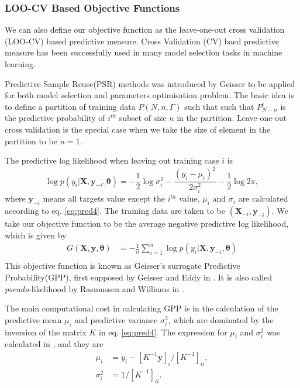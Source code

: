 \documentclass[11pt,a4paper]{article}
\theoremstyle{definition}
\numberwithin{equation}{section}
\let\vec\mathbf
\begin{document}
\subsubsection{LOO-CV Based Objective Functions}
We can also define our objective function as the leave-one-out cross validation (LOO-CV) based predictive measure. Cross Validation (CV) baed predictive measure has been successfully used in many model selection tasks in machine learning\cite[Cawley and Talbot]{Cawley_Talbot}\cite[Sundararajan and Keerthi]{Sundararajan_Keerthi}. 

Predictive Sample Reuse(PSR) methods was introduced by Geisser\cite{Geisser} to be applied for both model selection and parameters optimisation problem. The basic idea is to define a partition of training data $P(N,n,\Gamma)$ such that such that $P_{N-n}^i$ is the predictive probability of $i^{th}$ subset of size $n$ in the partition. Leave-one-out cross validation is the special case when we take the size of element in the partition to be $n=1$.

The predictive log likelihood when leaving out training case $i$ is
\begin{equation}\label{GPP_1}
\log p(y_i|\vec X,\vec y_{-i},\vec \theta) = -\frac{1}{2}\log\sigma^2_i - \frac{(y_i - \mu_i)^2}{2\sigma^2_i} - \frac{1}{2} \log 2 \pi, 
\end{equation}
where $\vec y_{-i}$  means all targets value except the $i^{th}$ value, $\mu_i$ and $\sigma_i$ are calculated according to eq. \ref{eq:pred4}. The training data are taken to be $(\vec X_{-i},\vec y_{-i})$. We take our objective function to be the average negative predictive log likelihood, which is given by
\begin{equation}\label{GPP}
\begin{split}
G(\vec X,\vec y, \vec \theta) &= -\frac{1}{n}\sum_{i=1}^{n}\log p(y_i|\vec X,\vec y_{-i},\vec \theta)\\
\end{split}
\end{equation}
This objective function is known as Geisser's surrogate Predictive Probability(GPP), first supposed by Geisser and Eddy in \cite{Geisser_Eddy}. It is also called \textit{pseudo}-likelihood by Rasmussen and Williams in \cite[sec. 5.4]{RandW}. 

The main computational cost in calculating GPP is in the calculation of the predictive mean $\mu_i$ and predictive variance $\sigma^2_i$, which are dominated by the inversion of the matrix $K$ in eq. \ref{eq:pred4}. The expression for $\mu_i$ and $\sigma^2_i$ was calculated in \cite{Sundararajan_Keerthi}, and they are
\begin{equation}\label{GPP_2}
\begin{split}
\mu_i &= y_i - [K^{-1}\vec y]_i/[K^{-1}]_{ii},\\
\sigma^2_i &= 1/[K^{-1}]_{ii}.
\end{split}
\end{equation}
\end{document}
